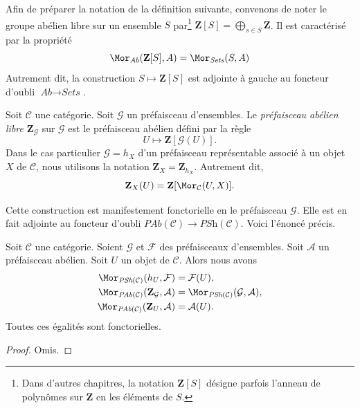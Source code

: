 \noindent
Afin de préparer la notation de la définition suivante, convenons de noter le
groupe abélien libre sur un ensemble $S$ par\footnote{Dans d'autres chapitres,
la notation $\mathbf{Z}[S]$ désigne parfois l'anneau de polynômes sur
$\mathbf{Z}$ en les éléments de $S$.}
$\mathbf{Z}[S] = \bigoplus_{s \in S} \mathbf{Z}$. Il est caractérisé par la
propriété
$$
\Mor_{\textit{Ab}}(\mathbf{Z}[S], A)
=
\Mor_{\textit{Sets}}(S, A)
$$
Autrement dit, la construction $S \mapsto \mathbf{Z}[S]$ est adjointe à
gauche au foncteur d'oubli $\textit{Ab} \to \textit{Sets}$.

\begin{definition}
\label{definition-free-abelian-presheaf-on}
Soit $\mathcal{C}$ une catégorie. Soit $\mathcal{G}$ un préfaisceau
d'ensembles. Le {\it préfaisceau abélien libre}
$\mathbf{Z}_\mathcal{G}$ sur $\mathcal{G}$ est le préfaisceau abélien défini
par la règle
$$
U \longmapsto \mathbf{Z}[\mathcal{G}(U)].
$$
Dans le cas particulier $\mathcal{G} = h_X$ d'un préfaisceau représentable
associé à un objet $X$ de $\mathcal{C}$, nous utilisons la notation
$\mathbf{Z}_X = \mathbf{Z}_{h_X}$. Autrement dit,
$$
\mathbf{Z}_X(U) = \mathbf{Z}[\Mor_\mathcal{C}(U, X)].
$$
\end{definition}

\noindent
Cette construction est manifestement fonctorielle en le préfaisceau
$\mathcal{G}$. Elle est en fait adjointe au foncteur d'oubli
$\textit{PAb}(\mathcal{C}) \to \textit{PSh}(\mathcal{C})$. Voici l'énoncé
précis.

\begin{lemma}
\label{lemma-obvious-adjointness}
Soit $\mathcal{C}$ une catégorie. Soient $\mathcal{G}$ et $\mathcal{F}$ des
préfaisceaux d'ensembles. Soit $\mathcal{A}$ un préfaisceau abélien. Soit $U$
un objet de $\mathcal{C}$. Alors nous avons
\begin{align*}
\Mor_{\textit{PSh}(\mathcal{C})}(h_U, \mathcal{F})
& =
\mathcal{F}(U), \\
\Mor_{\textit{PAb}(\mathcal{C})}(\mathbf{Z}_\mathcal{G}, \mathcal{A})
& =
\Mor_{\textit{PSh}(\mathcal{C})}(\mathcal{G}, \mathcal{A}), \\
\Mor_{\textit{PAb}(\mathcal{C})}(\mathbf{Z}_U, \mathcal{A})
& =
\mathcal{A}(U).
\end{align*}
Toutes ces égalités sont fonctorielles.
\end{lemma}

\begin{proof}
Omis.
\end{proof}

